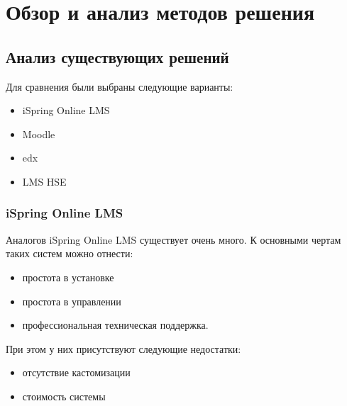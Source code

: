 \documentclass[a4paper,14pt]{article}
\begin{document}




\section{Обзор и анализ методов решения}

\subsection{Анализ существующих решений}


Для сравнения были выбраны следующие варианты:

\begin{itemize}
	\item iSpring Online LMS
	\item Moodle	
	\item edx
	\item LMS HSE
	
\end{itemize}


\subsubsection{iSpring Online LMS}

Аналогов iSpring Online LMS существует очень много.
К основными чертам таких систем можно отнести:
\begin{itemize}
	\item простота в установке
	\item простота в управлении	
	\item профессиональная техническая поддержка.
\end{itemize}

При этом у них присутствуют следующие недостатки:
\begin{itemize}
	\item отсутствие кастомизации
	\item стоимость системы
\end{itemize} 
\end{document}
